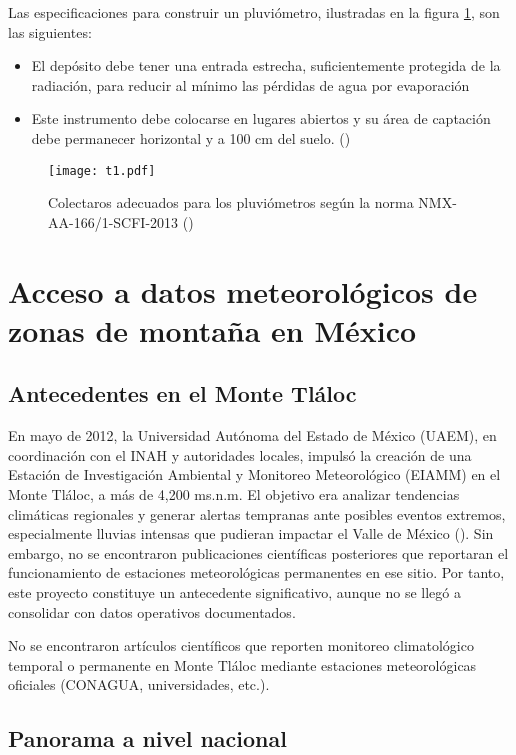 Las especificaciones para construir un pluviómetro, ilustradas en la figura \ref{t1}, son las siguientes:
\begin{itemize}
    \item El depósito debe tener una entrada estrecha, suficientemente protegida de la radiación, para reducir al mínimo las pérdidas de agua por evaporación
    \item Este instrumento debe colocarse en lugares abiertos y su área de captación debe permanecer horizontal y a 100 cm del suelo. (\cite{se2013})
\end{itemize}

\begin{figure}[h!]
\centering
  \texttt{[image: t1.pdf]}
  \caption{Colectaros adecuados para los pluviómetros según la norma NMX-AA-166/1-SCFI-2013 (\cite{se2013})}
  \label{t1}
\end{figure}


\newpage


\section{Acceso a datos meteorológicos de zonas de montaña en México}

\subsection{Antecedentes en el Monte Tláloc}

En mayo de 2012, la Universidad Autónoma del Estado de México (UAEM), en coordinación con el INAH y autoridades locales, impulsó la creación de una Estación de Investigación Ambiental y Monitoreo Meteorológico (EIAMM) en el Monte Tláloc, a más de 4,200 ms.n.m. El objetivo era analizar tendencias climáticas regionales y generar alertas tempranas ante posibles eventos extremos, especialmente lluvias intensas que pudieran impactar el Valle de México  (\cite{davila2012}). Sin embargo, no se encontraron publicaciones científicas posteriores que reportaran el funcionamiento de estaciones meteorológicas permanentes en ese sitio. Por tanto, este proyecto constituye un antecedente significativo, aunque no se llegó a consolidar con datos operativos documentados.

No se encontraron artículos científicos que reporten monitoreo climatológico temporal o permanente en Monte Tláloc mediante estaciones meteorológicas oficiales (CONAGUA, universidades, etc.).


\subsection{Panorama a nivel nacional}

